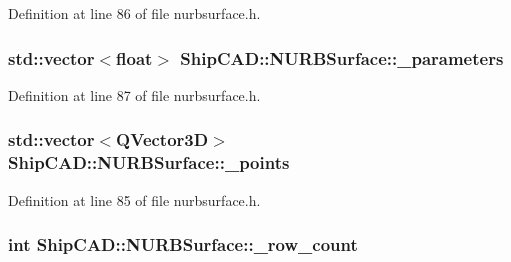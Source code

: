 Definition at line 86 of file nurbsurface.\+h.

\subsubsection[{\texorpdfstring{\+\_\+parameters}{_parameters}}]{\setlength{\rightskip}{0pt plus 5cm}std\+::vector$<$float$>$ Ship\+C\+A\+D\+::\+N\+U\+R\+B\+Surface\+::\+\_\+parameters\hspace{0.3cm}{\ttfamily [protected]}}\hypertarget{classShipCAD_1_1NURBSurface_a6de7536d23d408368f2df4470c1514af}{}\label{classShipCAD_1_1NURBSurface_a6de7536d23d408368f2df4470c1514af}


Definition at line 87 of file nurbsurface.\+h.

\subsubsection[{\texorpdfstring{\+\_\+points}{_points}}]{\setlength{\rightskip}{0pt plus 5cm}std\+::vector$<$Q\+Vector3D$>$ Ship\+C\+A\+D\+::\+N\+U\+R\+B\+Surface\+::\+\_\+points\hspace{0.3cm}{\ttfamily [protected]}}\hypertarget{classShipCAD_1_1NURBSurface_a371421f0aec85ad3cffc3dbeeb0b26e4}{}\label{classShipCAD_1_1NURBSurface_a371421f0aec85ad3cffc3dbeeb0b26e4}


Definition at line 85 of file nurbsurface.\+h.

\subsubsection[{\texorpdfstring{\+\_\+row\+\_\+count}{_row_count}}]{\setlength{\rightskip}{0pt plus 5cm}int Ship\+C\+A\+D\+::\+N\+U\+R\+B\+Surface\+::\+\_\+row\+\_\+count\hspace{0.3cm}{\ttfamily [protected]}}\hypertarget{classShipCAD_1_1NURBSurface_a251739da98a877b8d68722db5aa59371}{}\label{classShipCAD_1_1NURBSurface_a251739da98a877b8d68722db5aa59371}


